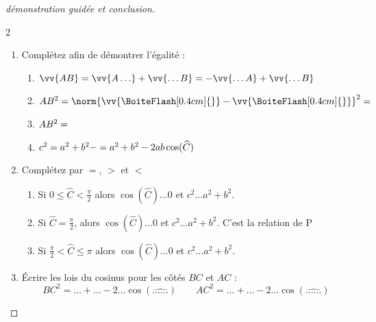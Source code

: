 \documentclass[main.tex]{subfiles}
\begin{document}
\begin{proof}[démonstration guidée et conclusion] 
\begin{spacing}{2}
\begin{enumerate}[label=\arabic*),leftmargin=*]
	\item Complétez afin de démontrer l'égalité : 
		\begin{enumerate}[label={},leftmargin=*]
			\item $\vv{AB}=\vv{A\ldots}+\vv{\ldots B} =-\vv{\ldots A}+\vv{\ldots B} $\dotfill  
			\item $AB^2=\norm{\vv{\BoiteFlash[0.4cm]{}} - \vv{\BoiteFlash[0.4cm]{}} }^2=\dotfill $ 
			\item $AB^2= \dotfill  $
			\item $c^2= a^2+ b^2 -\dotfill =a^2+b^2-2ab\cos(\widehat{C})  \hfill $   
		\end{enumerate}  
	\item Complétez par $=$, $>$ et $<$ 
\begin{enumerate}[label={},leftmargin=*] 
\item Si $0\leqslant \widehat{C}<\tfrac{\pi}{2}$ alors $\cos(\widehat{C})\ldots 0$ et $c^2\ldots a^2+b^2$.
\item Si $\widehat{C}=\tfrac{\pi}{2}$, alors $\cos(\widehat{C})\ldots 0$ et $c^2\ldots a^2+b^2$. C'est la relation de P\dotfill
\item Si $\tfrac{\pi}{2} < \widehat{C}\leqslant \pi$ alors $\cos(\widehat{C})\ldots 0$ et $c^2\ldots a^2+b^2$.
\end{enumerate}  
 	\item Écrire les lois du cosinus pour les côtés $BC$ et $AC$ :
	\setlength{\abovedisplayskip}{3pt}
	\setlength{\belowdisplayskip}{3pt}
	$$BC^2   =\ldots +\ldots-2\ldots\cos(\widehat{\ldots\ldots}) \qquad AC^2   =\ldots +\ldots-2\ldots\cos(\widehat{\ldots\ldots})  $$  
\end{enumerate}
\end{spacing}
\end{proof}
\end{document}
